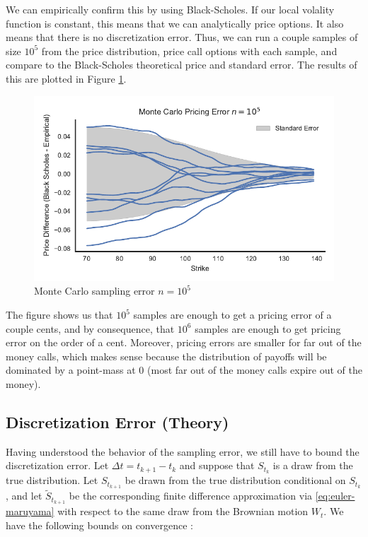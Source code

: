 \documentclass[12pt]{article}
\numberwithin{equation}{section}
\begin{document}
We can empirically confirm this by using Black-Scholes. If our local volality
function is constant, this means that we can analytically price options. It also
means that there is no discretization error. Thus, we can run a couple samples
of size $10^5$ from the price distribution, price call options with each sample,
and compare to the Black-Scholes theoretical price and standard error. The
results of this are plotted in Figure \ref{fig:mcsamplingerror}.


\begin{figure}[h]
\centering
\includegraphics{figs/mcsamplingerror}
\caption{Monte Carlo sampling error $n=10^5$}
\label{fig:mcsamplingerror}
\end{figure}

The figure shows us that $10^5$ samples are enough to get a pricing error of a
couple cents, and by consequence, that $10^6$ samples are enough to get pricing
error on the order of a cent. Moreover, pricing errors are smaller for far out
of the money calls, which makes sense because the distribution of payoffs will
be dominated by a point-mass at 0 (most far out of the money calls expire out of
the money).

\subsection{Discretization Error (Theory)}

Having understood the behavior of the sampling error, we still have to bound the
discretization error. Let $\Delta t = t_{k+1} - t_k$
and suppose that $S_{t_k}$ is a draw from the true distribution. Let
$S_{t_{k+1}}$ be drawn from the true distribution conditional on $S_{t_k}$, and
let $\tilde S_{t_{k+1}}$ be the corresponding finite difference approximation
via \eqref{eq:euler-maruyama} with respect to the same draw from the Brownian
motion $W_t$. We have the following bounds on convergence
\citep{higham2001algorithmic}:
\end{document}
